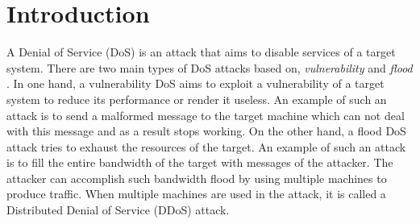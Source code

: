 \section{Introduction}
\label{section:introduction}
A Denial of Service (DoS) is an attack that aims to disable services of a target system. There are two main types of DoS attacks based on, \textit{vulnerability} and \textit{flood} \cite{Lin2013}. In one hand, a vulnerability DoS aims to exploit a vulnerability of a target system to reduce its performance or render it useless. An example of such an attack is to send a malformed message to the target machine which can not deal with this message and as a result stops working. On the other hand, a flood DoS attack tries to exhaust the resources of the target. An example of such an attack is to fill the entire bandwidth of the target with messages of the attacker. The attacker can accomplish such bandwidth flood by using multiple machines to produce traffic. When multiple machines are used in the attack, it is called a Distributed Denial of Service (DDoS) attack.  





